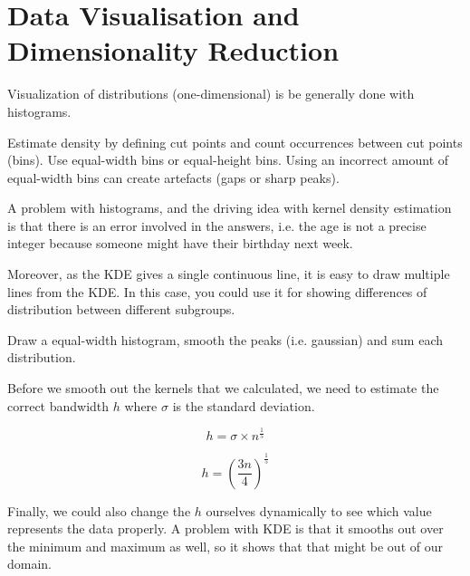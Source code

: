 \section{Data Visualisation and Dimensionality Reduction}

Visualization of distributions (one-dimensional) is be
generally done with histograms.

\begin{definition}[Histograms]
  Estimate density by defining cut points and count
  occurrences between cut points (bins). Use equal-width
  bins or equal-height bins. Using an incorrect amount of
  equal-width bins can create artefacts (gaps or sharp peaks).
\end{definition}

A problem with histograms, and the driving idea with kernel density
estimation is that there is an error involved in the answers, i.e. the
age is not a precise integer because someone might have
their birthday next week.

Moreover, as the KDE gives a single continuous line, it is easy
to draw multiple lines from the KDE. In this case, you
could use it for showing differences of distribution
between different subgroups.

\begin{definition}
  Draw a equal-width histogram, smooth the peaks
  (i.e. gaussian) and sum each distribution.
\end{definition}

Before we smooth out the kernels that we
calculated, we need to estimate the correct
bandwidth $h$ where $\sigma$ is the standard
deviation.

\begin{definition}
  \begin{displaymath}
    h = \sigma \times n^{\frac{1}{5}}
  \end{displaymath}
\end{definition}

\begin{definition}
  \begin{displaymath}
    h = \left(\frac{3n}{4}\right)^{\frac{1}{5}}
  \end{displaymath}
\end{definition}

Finally, we could also change the $h$ ourselves
dynamically to see which value represents the data
properly. A problem with KDE is that it smooths out
over the minimum and maximum as well, so it shows
that that might be out of our domain.

